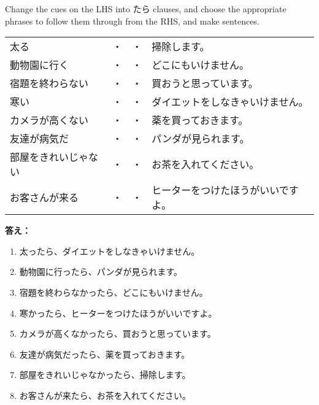 \documentclass[notoc,notitlepage]{tufte-book}
\begin{document}
\begin{ex}
  Change the cues on the LHS into たら clauses, and choose the appropriate phrases to follow them through from the RHS, and make sentences.
  \begin{tabular}{l c @{\hskip 2cm} c l}
  太る & ・ & ・ & 掃除します。\\
  動物園に行く & ・ & ・ & どこにもいけません。\\
  宿題を終わらない & ・ & ・ & 買おうと思っています。 \\
  寒い & ・ & ・ & ダイエットをしなきゃいけません。\\
  カメラが高くない & ・ & ・ & 薬を買っておきます。\\
  友達が病気だ & ・ & ・ & パンダが見られます。\\
  部屋をきれいじゃない & ・ & ・ & お茶を入れてください。\\
  お客さんが来る & ・ & ・ & ヒーターをつけたほうがいいですよ。
  \end{tabular}

  \noindent \textbf{答え：} \\
  \begin{enumerate}
    \item 太ったら、ダイエットをしなきゃいけません。
    \item 動物園に行ったら、パンダが見られます。
    \item 宿題を終わらなかったら、どこにもいけません。
    \item 寒かったら、ヒーターをつけたほうがいいですよ。
    \item カメラが高くなかったら、買おうと思っています。
    \item 友達が病気だったら、薬を買っておきます。
    \item 部屋をきれいじゃなかったら、掃除します。
    \item お客さんが来たら、お茶を入れてください。
  \end{enumerate}
\end{ex}
\end{document}
